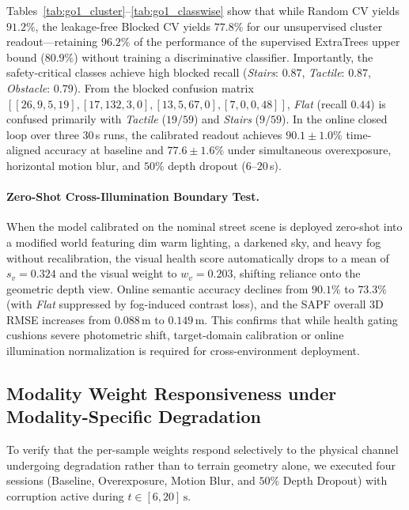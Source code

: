 \documentclass[11pt, a4paper]{article}
\begin{document}
Tables~\ref{tab:go1_cluster}--\ref{tab:go1_classwise} show that while Random CV yields $91.2\%$, the leakage-free Blocked CV yields $77.8\%$ for our unsupervised cluster readout—retaining $96.2\%$ of the performance of the supervised ExtraTrees upper bound ($80.9\%$) without training a discriminative classifier. Importantly, the safety-critical classes achieve high blocked recall (\textit{Stairs}: $0.87$, \textit{Tactile}: $0.87$, \textit{Obstacle}: $0.79$). From the blocked confusion matrix $[[26,9,5,19],[17,132,3,0],[13,5,67,0],[7,0,0,48]]$, \textit{Flat} (recall $0.44$) is confused primarily with \textit{Tactile} ($19/59$) and \textit{Stairs} ($9/59$). In the online closed loop over three 30\,s runs, the calibrated readout achieves $90.1\pm1.0\%$ time-aligned accuracy at baseline and $77.6\pm1.6\%$ under simultaneous overexposure, horizontal motion blur, and $50\%$ depth dropout ($6$--$20$\,s).

\paragraph{Zero-Shot Cross-Illumination Boundary Test.}
When the model calibrated on the nominal street scene is deployed zero-shot into a modified world featuring dim warm lighting, a darkened sky, and heavy fog without recalibration, the visual health score automatically drops to a mean of $s_v = 0.324$ and the visual weight to $w_v = 0.203$, shifting reliance onto the geometric depth view. Online semantic accuracy declines from $90.1\%$ to $73.3\%$ (with \textit{Flat} suppressed by fog-induced contrast loss), and the SAPF overall 3D RMSE increases from $0.088\,\text{m}$ to $0.149\,\text{m}$. This confirms that while health gating cushions severe photometric shift, target-domain calibration or online illumination normalization is required for cross-environment deployment.

\subsection{Modality Weight Responsiveness under Modality-Specific Degradation}
\label{subsec:weights_exp}
To verify that the per-sample weights respond selectively to the physical channel undergoing degradation rather than to terrain geometry alone, we executed four sessions (Baseline, Overexposure, Motion Blur, and $50\%$ Depth Dropout) with corruption active during $t \in [6,20]\,\text{s}$.
\end{document}

